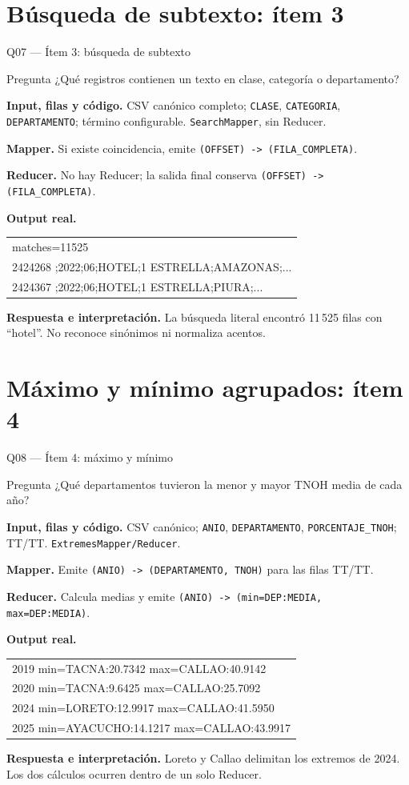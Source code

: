 \documentclass{beamer}
\newcommand{\queryframe}[7]{%
\begin{frame}{#1}
\scriptsize
\begin{alertblock}{Pregunta}
#2
\end{alertblock}
\textbf{Input, filas y código.} #3

\vspace{0.45em}
\textbf{Mapper.} #4

\vspace{0.45em}
\textbf{Reducer.} #5

\vspace{0.45em}
\textbf{Output real.} {\ttfamily\tiny #6}

\vspace{0.45em}
\textbf{Respuesta e interpretación.} #7
\end{frame}
}
\begin{document}
\section{Búsqueda de subtexto: ítem 3}

\queryframe{Q07 — Ítem 3: búsqueda de subtexto}
{¿Qué registros contienen un texto en clase, categoría o departamento?}
{CSV canónico completo; \texttt{CLASE}, \texttt{CATEGORIA}, \texttt{DEPARTAMENTO}; término configurable. \texttt{SearchMapper}, sin Reducer.}
{Si existe coincidencia, emite \texttt{(OFFSET) -> (FILA\_COMPLETA)}.}
{No hay Reducer; la salida final conserva \texttt{(OFFSET) -> (FILA\_COMPLETA)}.}
{\begin{tabular}{@{}l@{}}
matches=11525 \\
2424268 ;2022;06;HOTEL;1 ESTRELLA;AMAZONAS;... \\
2424367 ;2022;06;HOTEL;1 ESTRELLA;PIURA;...
\end{tabular}}
{La búsqueda literal encontró 11\,525 filas con ``hotel''. No reconoce sinónimos ni normaliza acentos.}

\section{Máximo y mínimo agrupados: ítem 4}

\queryframe{Q08 — Ítem 4: máximo y mínimo}
{¿Qué departamentos tuvieron la menor y mayor TNOH media de cada año?}
{CSV canónico; \texttt{ANIO}, \texttt{DEPARTAMENTO}, \texttt{PORCENTAJE\_TNOH}; TT/TT. \texttt{ExtremesMapper/Reducer}.}
{Emite \texttt{(ANIO) -> (DEPARTAMENTO, TNOH)} para las filas TT/TT.}
{Calcula medias y emite \texttt{(ANIO) -> (min=DEP:MEDIA, max=DEP:MEDIA)}.}
{\begin{tabular}{@{}l@{}}
2019 min=TACNA:20.7342 max=CALLAO:40.9142 \\
2020 min=TACNA:9.6425 max=CALLAO:25.7092 \\
2024 min=LORETO:12.9917 max=CALLAO:41.5950 \\
2025 min=AYACUCHO:14.1217 max=CALLAO:43.9917
\end{tabular}}
{Loreto y Callao delimitan los extremos de 2024. Los dos cálculos ocurren dentro de un solo Reducer.}

\end{document}
